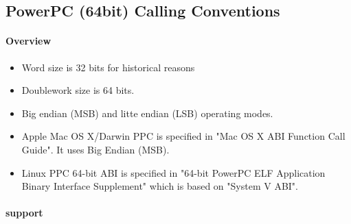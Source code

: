 %
%
%
%

\subsection{PowerPC (64bit) Calling Conventions}

\paragraph{Overview}

\begin{itemize}
\item Word size is 32 bits for historical reasons
\item Doublework size is 64 bits.
\item Big endian (MSB) and litte endian (LSB) operating modes.
\item Apple Mac OS X/Darwin PPC is specified in "Mac OS X ABI Function Call Guide"\cite{ppcMacOSX}. It uses Big Endian (MSB).
\item Linux PPC 64-bit ABI is specified in "64-bit PowerPC ELF Application Binary Interface Supplement"\cite{ppcelf64abi} which is based on "System V ABI".
\end{itemize}

\paragraph{ support}

